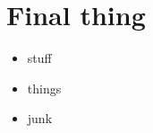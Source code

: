 \documentclass{beamer}
\begin{document}
\section*{Final thing}
\begin{frame}
	\begin{itemize}
		\item stuff
		\item things
		\item junk
	\end{itemize}
\end{frame}



	
\end{document}

